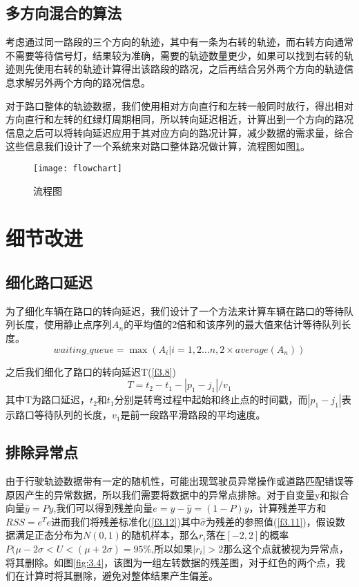 \subsection{多方向混合的算法}

考虑通过同一路段的三个方向的轨迹，其中有一条为右转的轨迹，而右转方向通常不需要等待信号灯，结果较为准确，需要的轨迹数量更少，如果可以找到右转的轨迹则先使用右转的轨迹计算得出该路段的路况，之后再结合另外两个方向的轨迹信息求解另外两个方向的路况信息。

对于路口整体的轨迹数据，我们使用相对方向直行和左转一般同时放行，得出相对方向直行和左转的红绿灯周期相同，所以转向延迟相近，计算出到一个方向的路况信息之后可以将转向延迟应用于其对应方向的路况计算，减少数据的需求量，综合这些信息我们设计了一个系统来对路口整体路况做计算，流程图如图\ref{fig:3.3}。

\begin{figure}[H] 
  \centering
  \texttt{[image: flowchart]}
  \caption{流程图}
  \label{fig:3.3}
\end{figure}

\section{细节改进}

\subsection{细化路口延迟}
为了细化车辆在路口的转向延迟，我们设计了一个方法来计算车辆在路口的等待队列长度，使用静止点序列$A_{n}$的平均值的2倍和和该序列的最大值来估计等待队列长度。
\begin{equation}
waiting\_queue = \max (A_{i}|i=1,2...n,2\times average(A_{n}))
\label{f3.7}
\end{equation}

之后我们细化了路口的转向延迟T(\ref{f3.8})
\begin{equation}
T = t_{2}-t_{1}-|p_{1}-j_{1}|/v_{1}
\label{f3.8}
\end{equation}
其中T为路口延迟，$t_{2}$和$t_{1}$分别是转弯过程中起始和终止点的时间戳，而$|p_{1}-j_{1}|$表示路口等待队列的长度，$v_{1}$是前一段路平滑路段的平均速度。

\subsection{排除异常点}

由于行驶轨迹数据带有一定的随机性，可能出现驾驶员异常操作或道路匹配错误等原因产生的异常数据，所以我们需要将数据中的异常点排除。对于自变量y和拟合向量$\hat{y} = Py$,我们可以得到残差向量$e = y - \hat{y} = (1-P)y$，计算残差平方和$RSS=e^{T}e$进而我们将残差标准化(\ref{f3.12})其中$\hat{\sigma} $为残差的参照值(\ref{f3.11})，假设数据满足正态分布为$N(0,1)$的随机样本，那么$r_{i}$落在$[-2,2]$的概率$P(\mu - 2\sigma < U < (\mu + 2\sigma ) = 95\%$,所以如果$|r_{i}|>2$那么这个点就被视为异常点，将其删除。如图\ref{fig:3.4}，该图为一组左转数据的残差图，对于红色的两个点，我们在计算时将其删除，避免对整体结果产生偏差。

